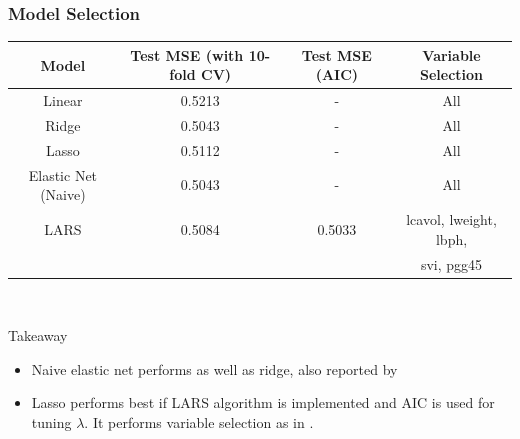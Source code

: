 \begin{frame}
\frametitle{Model Selection}
\begin{center}
\small
\begin{tabular}{||c c c c||} 
 \hline
 Model & Test MSE (with 10-fold CV) & Test MSE (AIC) & Variable Selection\\ [0.5ex] 
 \hline\hline
 Linear & 0.5213 & - & All\\ 
 \hline
 Ridge & 0.5043 & - & All\\
 \hline
 Lasso & 0.5112 & - & All\\
 \hline
 Elastic Net (Naive) & 0.5043 & - & All\\
 \hline
 LARS & 0.5084 & 0.5033 & lcavol, lweight, lbph, \\ & & & svi, pgg45\\
 \hline
\end{tabular}
\end{center}\\

\begin{block}{Takeaway}
\begin{itemize}
\item Naive elastic net performs as well as ridge, also reported by \cite{zou2005regularization}
\item Lasso performs best if LARS algorithm is implemented and AIC is used for tuning $\lambda$. It performs variable selection as in \cite{zou2005regularization}.
\end{itemize}
\end{block}

\end{frame}